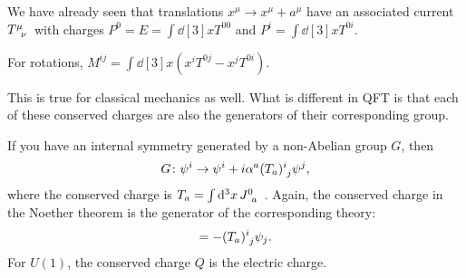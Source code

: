 \begin{example}
  We have already seen that translations $x^{\mu} \to x^{\mu} + a^{\mu}$  have an associated current $T\indices{^{\mu}_{\nu}}$  with charges $P^0 = E = \int \dd[3]{x} T^{00}$  and $P^i = \int \dd[3]{x} T^{0i}$.

  For rotations, $M^{ij} =  \int \dd[3]{x} \left( x^{i} T^{0j} - x^j T^{0i} \right)$.

  This is true for classical mechanics as well. What is different in QFT is that each of these conserved charges are also the generators of their corresponding group.
\end{example}
\begin{example}
  If you have an internal symmetry generated by a non-Abelian group $G$, then 
   \begin{equation}
    G\colon \psi^{i} \to \psi^{i} + i \alpha^a (T_a)\indices{^{i}_{j}} \psi^{j}, 
  \end{equation}
  where the conserved charge is $T_a = \int \dd[3]{x} J\indices{^{0}_a}$ .
  Again, the conserved charge in the Noether theorem is the generator of the corresponding theory:
  \begin{equation}
    [T_a, \psi^{i}] = -(T_a)\indices{^{i}_{j}} \psi_j.
  \end{equation}
  For $U(1)$, the conserved charge $Q$ is the electric charge.
\end{example}
